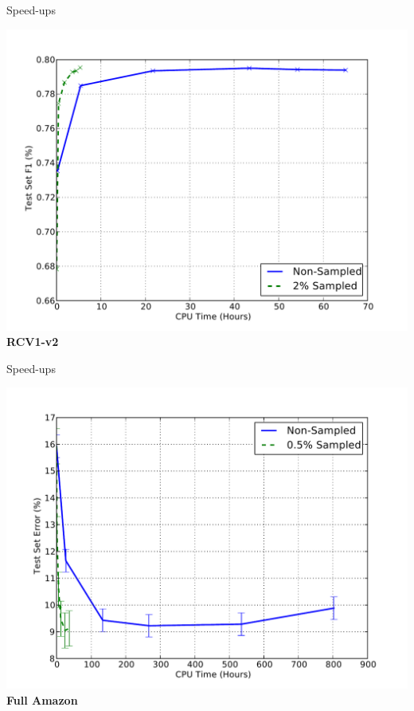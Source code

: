 \documentclass{beamer}
\begin{document}
\begin{frame}{Speed-ups}
\begin{center}
\begin{minipage}{.7\textwidth}
\begin{center}
  \includegraphics[width=.95\textwidth]{images/rcv1_speedup.pdf}\\
  {\bf RCV1-v2}
\end{center}
\end{minipage}
\end{center}
\end{frame}

\begin{frame}{Speed-ups}
\begin{center}
\begin{minipage}{.7\textwidth}
\begin{center}
  \includegraphics[width=.95\textwidth]{images/fullamazon_speedup.pdf}\\
  {\bf Full Amazon}
\end{center}
\end{minipage}
\end{center}
\end{frame}
\end{document}
